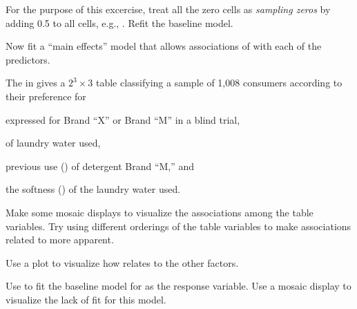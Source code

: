 \documentclass[10pt]{report}\usepackage[]{graphicx}\usepackage[]{color}
\begin{document}
\begin{Exercises}
\begin{enumerate*}
    \item For the purpose of this excercise, treat all the zero cells as \emph{sampling zeros}
    by adding 0.5 to all cells, e.g., .
    Refit the baseline model.
    \begin{ans}
    \end{ans}
    
    \item Now fit a ``main effects'' model 
    that allows associations of  with each of
    the predictors.
    \begin{ans}
    \end{ans}
     
  \end{enumerate*}

  \exercise The  in  gives a $2^3 \times 3$ table classifying 
  a sample of 1,008 consumers according to their preference for  
  \begin{seriate}
    \item expressed  for Brand ``X'' or Brand ``M'' in a blind trial,
    \item {} of laundry water used,
    \item previous use () of detergent Brand ``M,'' and
    \item the softness () of the laundry water used.
  \end{seriate}
  \begin{enumerate*}
    \item Make some mosaic displays to visualize the associations among the table variables.  
    Try using different orderings of the table variables to make associations related to  more apparent.
    \begin{ans}
    \end{ans}
    
    \item Use a  plot to visualize how  relates to the other factors.
    \begin{ans}
    \end{ans}
    
    \item Use  to fit the baseline model  for  as the response variable.
    Use a mosaic display to visualize the lack of fit for this model.
    \begin{ans}
    \end{ans}
    

\end{enumerate*}
\end{Exercises}
\end{document}
